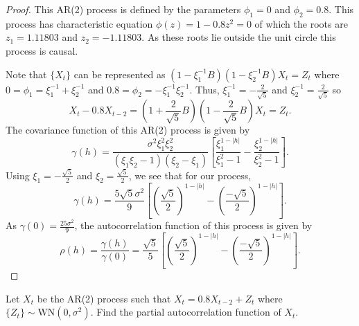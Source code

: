 \documentclass[12pt]{article}
\theoremstyle{definition}
\newenvironment{custompbm}[1]
  {\renewcommand\theproblem{#1}\problem}
  {\endproblem}
\begin{document}
\begin{proof}
  This AR(2) process is defined by the parameters $\phi_1 = 0$ and $\phi_2 = 0.8$.
  This process has characteristic equation $\phi(z) = 1 - 0.8z^2 = 0$ of which
  the roots are $z_1 = 1.11803$ and $z_2 = -1.11803$. As these roots lie outside the unit
  circle this process is causal.

  Note that $\{X_t\}$ can be represented as $(1 - \xi_1^{-1}B)(1 - \xi_2^{-1}B)X_t = Z_t$ where
  $0 = \phi_1 = \xi_1^{-1} + \xi_2^{-1}$ and $0.8 = \phi_2 =-\xi_1^{-1} \xi_2^{-1}$. Thus,
  $\xi_1^{-1} = - \frac{2}{\sqrt{5}}$ and $\xi_2^{-1} = \frac{2}{\sqrt{5}}$ so
  \[
    X_t - 0.8 X_{t-2} = \left(1 + \frac{2}{\sqrt{5}}B\right)\left(1 - \frac{2}{\sqrt{5}}B\right)X_t = Z_t.
  \]
  The covariance function of this AR(2) process is given by
  \[
    \gamma(h) = \frac{\sigma^2 \xi_1^2 \xi_2^2}{(\xi_1 \xi_2 - 1)(\xi_2 - \xi_1)}\left[\frac{\xi_1^{1-|h|}}{\xi_1^2 - 1} - \frac{\xi_2^{1-|h|}}{\xi_2^2 - 1}\right].
  \]
  Using $\xi_1 = -\frac{\sqrt{5}}{2} $ and $\xi_2 = \frac{\sqrt{5}}{2}$, we see that for our process,
  \[
    \gamma(h) = \frac{5\sqrt{5}\sigma^2}{9}\left[\left(\frac{\sqrt{5}}{2}\right)^{1-|h|} - \left(\frac{-\sqrt{5}}{2}\right)^{1-|h|}\right].
  \]
  As $\gamma(0) = \frac{25 \sigma^2}{9}$, the autocorrelation function of this process is given by
  \[
    \rho(h) = \frac{\gamma(h)}{\gamma(0)} = \frac{\sqrt{5}}{5}\left[\left(\frac{\sqrt{5}}{2}\right)^{1-|h|} - \left(\frac{-\sqrt{5}}{2}\right)^{1-|h|}\right].
  \]
\end{proof}


\begin{custompbm}{2.b}
  Let $X_t$ be the AR(2) process such that $X_t = 0.8X_{t-2} + Z_t$ where $\{Z_t\}\sim \text{WN}(0, \sigma^2)$.
  Find the partial autocorrelation function of $X_t$.
\end{custompbm}
\end{document}
